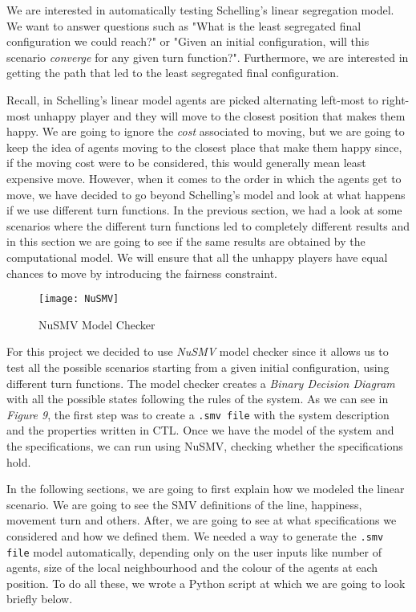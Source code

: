 \documentclass[../main.tex]{subfiles}
\begin{document}
We are interested in automatically testing Schelling's linear segregation model. We want to answer questions such as "What is the least segregated final configuration we could reach?" or "Given an initial configuration, will this scenario \textit{converge} for any given turn function?". Furthermore, we are interested in getting the path that led to the least segregated final configuration. 

Recall, in Schelling's linear model agents are picked alternating left-most to right-most unhappy player and they will move to the closest position that makes them happy. We are going to ignore the \textit{cost} associated to moving, but we are going to keep the idea of agents moving to the closest place that make them happy since, if the moving cost were to be considered, this would generally mean least expensive move. However, when it comes to the order in which the agents get to move, we have decided to go beyond Schelling's model and look at what happens if we use different turn functions. In the previous section, we had a look at some scenarios where the different turn functions led to completely different results and in this section we are going to see if the same results are obtained by the computational model. We will ensure that all the unhappy players have equal chances to move by introducing the fairness constraint.


\begin{figure}[H]
\centering
\texttt{[image: NuSMV]}
\caption{NuSMV Model Checker}
\end{figure}

For this project we decided to use \textit{NuSMV} model checker since it allows us to test all the possible scenarios starting from a given initial configuration, using different turn functions. The model checker creates a \textit{Binary Decision Diagram} with all the possible states following the rules of the system. As we can see in \textit{Figure 9}, the first step was to create a \verb|.smv file| with the system description and the properties written in CTL\cite[]{CTL}. Once we have the model of the system and the specifications, we can run using NuSMV, checking whether the specifications hold.

In the following sections, we are going to first explain how we modeled the linear scenario. We are going to see the SMV definitions of the line, happiness, movement turn and others. After, we are going to see at what specifications we considered and how we defined them. We needed a way to generate the \verb|.smv file| model automatically, depending only on the user inputs like number of agents, size of the local neighbourhood and the colour of the agents at each position. To do all these, we wrote a Python script at which we are going to look briefly below. 
\end{document}

